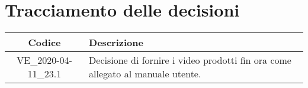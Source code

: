 \section*{Tracciamento delle decisioni}

\begin{center}
	\begin{longtable}{|c|p{12.25cm}|}
	\hline
	\rowcolor{lighter-grayer}
	\textbf{Codice} & \textbf{Descrizione} \\
	\hline
	\endfirsthead

	\hline
	VE\_2020-04-11\_23.1 & Decisione di fornire i video prodotti fin ora come allegato al manuale utente. \\
	\hline

	\end{longtable}
\end{center}
